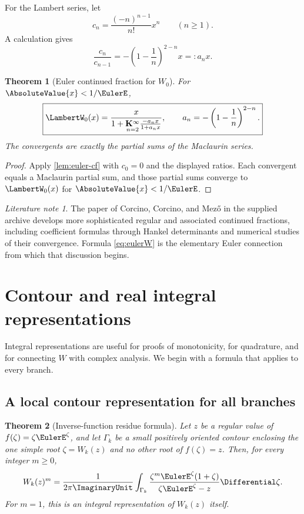 \documentclass[11pt]{article}
\newtheorem{theorem}{Theorem}[section]
\theoremstyle{remark}
\newtheorem{literaturenote}[literaturenote]{Literature note}
\newcommand{\Wz}{\LambertW_{0}}
\begin{document}
For the Lambert series, let
\[
       c_n=\frac{(-n)^{n-1}}{n!}x^n\qquad(n\geq1).
\]
A calculation gives
\[
 \frac{c_n}{c_{n-1}}
 =-\left(1-\frac1n\right)^{2-n}x=:a_nx.
\]

\begin{theorem}[Euler continued fraction for \(W_0\)]\label{thm:eulerW}
For \(\AbsoluteValue{x}<1/\EulerE\),
\begin{equation}\label{eq:eulerW}
 \boxed{\displaystyle
 \Wz(x)=
 \frac{x}{
  1+\underset{n=2}{\mathbf K^\infty}
  \frac{-a_nx}{1+a_nx}},
 \qquad
 a_n=-\left(1-\frac1n\right)^{2-n}.}
\end{equation}
The convergents are exactly the partial sums of the Maclaurin series.
\end{theorem}

\begin{proof}
Apply \cref{lem:euler-cf} with \(c_0=0\) and the displayed ratios.
Each convergent equals a Maclaurin partial sum, and those partial sums
converge to \(\Wz(x)\) for \(\AbsoluteValue{x}<1/\EulerE\).
\end{proof}

\begin{literaturenote}
The paper of Corcino, Corcino, and Mez\H{o} in the supplied archive develops
more sophisticated regular and associated continued fractions, including
coefficient formulas through Hankel determinants and numerical studies of
their convergence.  Formula \eqref{eq:eulerW} is the elementary Euler
connection from which that discussion begins.
\end{literaturenote}


\section{Contour and real integral representations}\label{sec:integralreps}

Integral representations are useful for proofs of monotonicity, for
quadrature, and for connecting \(W\) with complex analysis.  We begin with a
formula that applies to every branch.

\subsection{A local contour representation for all branches}

\begin{theorem}[Inverse-function residue formula]\label{thm:contour-all}
Let \(z\) be a regular value of \(f(\zeta)=\zeta\EulerE^\zeta\), and let
\(\Gamma_k\) be a small positively oriented contour enclosing the one simple
root \(\zeta=W_k(z)\) and no other root of \(f(\zeta)=z\).  Then, for every
integer \(m\geq0\),
\begin{equation}\label{eq:contour-all}
 W_k(z)^m
 =\frac{1}{2\pi\ImaginaryUnit}\int_{\Gamma_k}
 \frac{\zeta^m\EulerE^\zeta(1+\zeta)}
      {\zeta\EulerE^\zeta-z}\Differential\zeta.
\end{equation}
For \(m=1\), this is an integral representation of \(W_k(z)\) itself.
\end{theorem}
\end{document}
